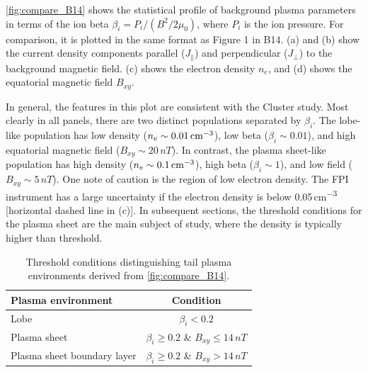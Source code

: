 \documentclass[draft]{agujournal2019}
\begin{document}
\cref{fig:compare_B14} shows the statistical profile of background plasma parameters in terms of the ion beta ${\beta_i=P_i/(B^2/2\mu_0)}$, where $P_i$ is the ion pressure. For comparison, it is plotted in the same format as Figure 1 in B14. (a) and (b) show the current density components parallel ($J_\|$) and perpendicular ($J_\perp$) to the background magnetic field. (c) shows the electron density $n_e$, and (d) shows the equatorial magnetic field $B_{xy}$.  

In general, the features in this plot are consistent with the Cluster study. Most clearly in all panels, there are two distinct populations separated by $\beta_i$. The lobe-like population has low density (${n_e\sim0.01\,\si{cm\tothe{-3}}}$), low beta (${\beta_i\sim0.01}$), and high equatorial magnetic field (${B_{xy}\sim20\,\si{nT}}$). In contrast, the plasma sheet-like population has high density (${n_e\sim0.1\,\si{cm\tothe{-3}}}$), high beta (${\beta_i\sim1}$), and low field (${B_{xy}\sim5\,\si{nT}}$). One note of caution is the region of low electron density. The FPI instrument has a large uncertainty if the electron density is below \mbox{0.05\,\si{cm\tothe{-3}}} [horizontal dashed line in (c)].  In subsequent sections, the threshold conditions for the plasma sheet are the main subject of study, where the density is typically higher than  threshold. 

\begin{table}
\caption{Threshold conditions distinguishing tail plasma environments derived from \cref{fig:compare_B14}.}
\label{tab:threshold_conditions}
\centering
\begin{tabular}{l c}
\hline
 Plasma environment             & Condition  \\
\hline
  Lobe                          & ${\beta_i<0.2}$  \\
  Plasma sheet                  & ${\beta_i\geq0.2}$ \& ${B_{xy}\leq14\,\si{nT}}$  \\
  Plasma sheet boundary layer   & ${\beta_i\geq0.2}$ \& ${B_{xy}>14\,\si{nT}}$  \\
\hline
\end{tabular}
\end{table}
\end{document}
